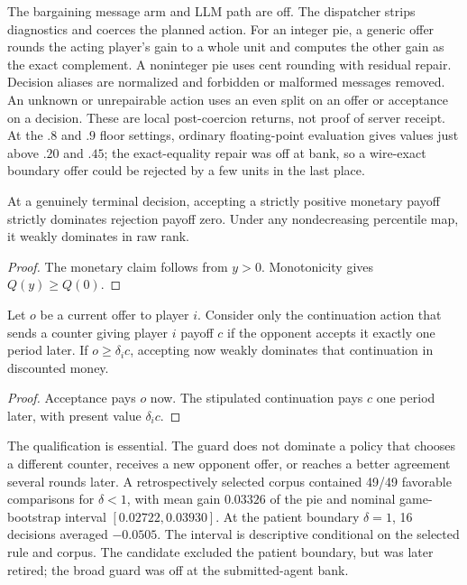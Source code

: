 The bargaining message arm and LLM path are off. The dispatcher strips
diagnostics and coerces the planned action. For an integer pie, a generic offer
rounds the acting player's gain to a whole unit and computes the other gain as
the exact complement. A noninteger pie uses cent rounding with residual repair.
Decision aliases are normalized and forbidden or malformed messages removed.
An unknown or unrepairable action uses an even split on an offer or acceptance
on a decision. These are local post-coercion returns, not proof of server
receipt. At the $.8$ and $.9$ floor settings, ordinary floating-point
evaluation gives values just above $.20$ and $.45$; the exact-equality repair
was off at bank, so a wire-exact boundary offer could be rejected by a few
units in the last place.

\begin{proposition}
At a genuinely terminal decision, accepting a strictly positive monetary
payoff strictly dominates rejection payoff zero. Under any nondecreasing
percentile map, it weakly dominates in raw rank.
\end{proposition}
\begin{proof}
The monetary claim follows from $y>0$. Monotonicity gives $Q(y)\geq Q(0)$.
\end{proof}

\begin{proposition}
Let $o$ be a current offer to player $i$. Consider only the continuation action
that sends a counter giving player $i$ payoff $c$ if the opponent accepts it
exactly one period later.
If $o\geq\delta_i c$, accepting now weakly dominates that continuation in
discounted money.
\end{proposition}
\begin{proof}
Acceptance pays $o$ now. The stipulated continuation pays $c$ one period later,
with present value $\delta_i c$.
\end{proof}

The qualification is essential. The guard does not dominate a policy that
chooses a different counter, receives a new opponent offer, or reaches a better
agreement several rounds later. A retrospectively selected corpus contained
49/49 favorable comparisons for $\delta<1$, with mean gain $0.03326$ of the pie
and nominal game-bootstrap interval $[0.02722,0.03930]$. At the patient boundary
$\delta=1$, 16 decisions averaged $-0.0505$. The interval is descriptive
conditional on the selected rule and corpus. The candidate excluded the patient
boundary, but was later retired; the broad guard was off at the submitted-agent bank.


